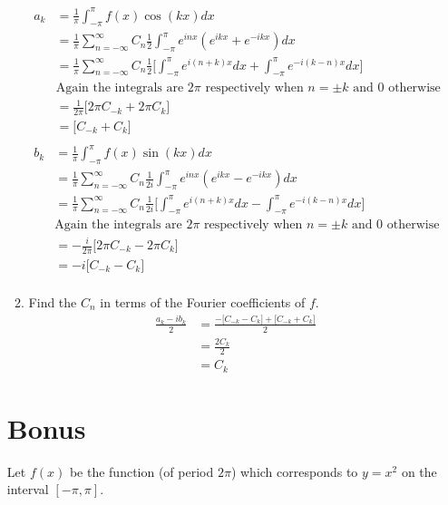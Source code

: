 \documentclass{article}
\begin{document}
\begin{enumerate}
\begin{enumerate}
\begin{align*}
a_k &= \frac{1}{\pi} \int_{-\pi}^{\pi}f(x)\cos(kx)dx \\
&= \frac{1}{\pi} \sum_{n=-\infty}^{\infty}C_n \frac{1}{2}\int_{-\pi}^{\pi}e^{inx}(e^{ikx} + e^{-ikx})dx \\
&= \frac{1}{\pi} \sum_{n=-\infty}^{\infty}C_n \frac{1}{2}\Big[ \int_{-\pi}^{\pi}e^{i(n+k)x}dx + \int_{-\pi}^{\pi}e^{-i(k - n)x}dx \Big] \\
&\text{Again the integrals are $2\pi$ respectively when $n = \pm k$ and 0 otherwise} \\
&= \frac{1}{2\pi} \Bigg[2\pi C_{-k} + 2\pi C_{k} \Bigg] \\
&= \Big[C_{-k} + C_{k} \Big] \\
\end{align*}
\begin{align*}
b_k &= \frac{1}{\pi} \int_{-\pi}^{\pi}f(x)\sin(kx)dx \\
&= \frac{1}{\pi} \sum_{n=-\infty}^{\infty}C_n \frac{1}{2i}\int_{-\pi}^{\pi}e^{inx}(e^{ikx} - e^{-ikx})dx \\
&= \frac{1}{\pi} \sum_{n=-\infty}^{\infty}C_n \frac{1}{2i}\Big[ \int_{-\pi}^{\pi}e^{i(n+k)x}dx - \int_{-\pi}^{\pi}e^{-i(k - n)x}dx \Big] \\
&\text{Again the integrals are $2\pi$ respectively when $n = \pm k$ and 0 otherwise} \\
&= -\frac{i}{2\pi} \Bigg[2\pi C_{-k} - 2\pi C_{k} \Bigg] \\
&= -i\Big[C_{-k} - C_{k} \Big] \\
\end{align*}
\item Find the $C_n$ in terms of the Fourier coefficients of $f$.
\begin{align*}
    \frac{a_k -ib_k }{2} &= \frac{-\Big[C_{-k} - C_{k} \Big] +\Big[C_{-k} + C_{k} \Big]}{2} \\
    &= \frac{2C_k}{2} \\
    &= C_k
\end{align*}
\end{enumerate}
\newpage
\section*{Bonus}
Let $f(x)$ be the function (of period $2\pi$) which corresponds to $y=x^2$ on the interval $[-\pi, \pi]$.


\end{enumerate}
\end{document}
